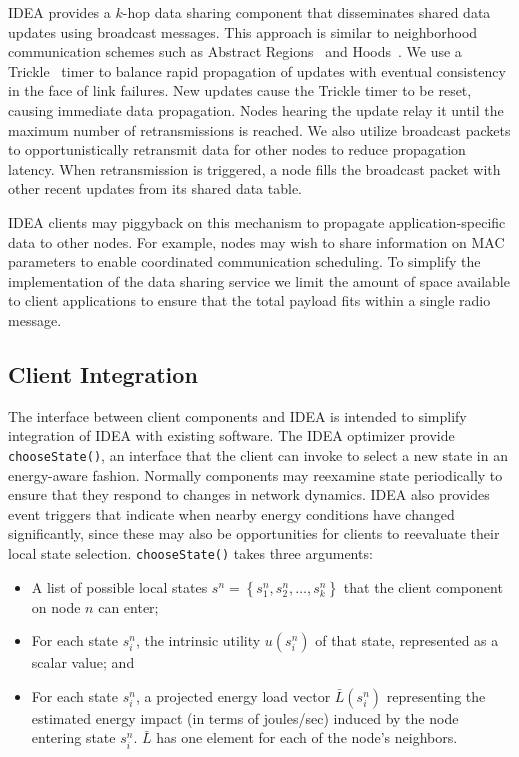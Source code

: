 IDEA provides a $k$-hop data sharing component that disseminates shared data
updates using broadcast messages. This approach is similar to neighborhood
communication schemes such as Abstract Regions~\cite{regions-nsdi04} and
Hoods~\cite{hoods-mobisys}. We use a Trickle~\cite{trickle} timer to balance
rapid propagation of updates with eventual consistency in the face of link
failures. New updates cause the Trickle timer to be reset, causing immediate
data propagation. Nodes hearing the update relay it until the maximum number
of retransmissions is reached. We also utilize broadcast packets to
opportunistically retransmit data for other nodes to reduce propagation
latency. When retransmission is triggered, a node fills the broadcast packet
with other recent updates from its shared data table.

IDEA clients may piggyback on this mechanism to propagate
application-specific data to other nodes. For example, nodes may wish to
share information on MAC parameters to enable coordinated communication
scheduling. To simplify the implementation of the data sharing service we
limit the amount of space available to client applications to ensure that the
total payload fits within a single radio message.

\subsection{Client Integration}

The interface between client components and IDEA is intended to simplify
integration of IDEA with existing software. The IDEA optimizer provide
\texttt{chooseState()}, an interface that the client can invoke to select a
new state in an energy-aware fashion. Normally components may reexamine state
periodically to ensure that they respond to changes in network dynamics. IDEA
also provides event triggers that indicate when nearby energy conditions have
changed significantly, since these may also be opportunities for clients to
reevaluate their local state selection. \texttt{chooseState()} takes three
arguments:

\begin{itemize}

\item A list of possible local states $s^n = \left\{ s^n_1, s^n_2, \ldots,
s^n_k\right\}$ that the client component on node $n$ can enter;

\item For each state $s^n_i$, the intrinsic utility $u(s^n_i)$ of that state,
represented as a scalar value; and

\item For each state $s^n_i$, a projected energy load vector $\bar{L}(s^n_i)$
representing the estimated energy impact (in terms of joules/sec) induced by
the node entering state $s^n_i$. $\bar{L}$ has one element for each of the
node's neighbors.

\end{itemize}

